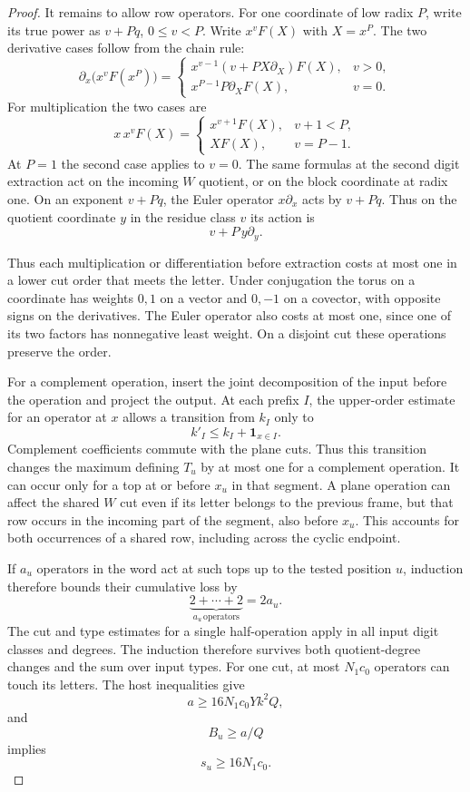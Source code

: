 \begin{proof}
It remains to allow row operators. For one coordinate of low radix
\(P\), write its true power as \(v+Pq\), \(0\le v<P\).
Write \(x^v F(X)\) with \(X=x^P\). The two derivative
cases follow from the chain rule:
\[
 \partial_x\!\bigl(x^vF(x^P)\bigr)=
 \begin{cases}
   x^{v-1}(v+P X\partial_X)F(X),&v>0,\\
   x^{P-1}P\partial_X F(X),&v=0 .
 \end{cases}
\]
For multiplication the two cases are
\[
 x\,x^v F(X)=
 \begin{cases}
 x^{v+1}F(X),&v+1<P,\\
 X F(X),&v=P-1 .
 \end{cases}
\]
At \(P=1\) the second case applies to \(v=0\). The same
formulas at the second digit extraction act on the incoming
\(W\) quotient, or on the block coordinate at radix one. On an exponent \(v+Pq\), the Euler operator \(x\partial_x\) acts by \(v+Pq\). Thus on the quotient coordinate \(y\) in the residue class \(v\) its action is
\[
 v+P\,y\partial_y.
\]

Thus each multiplication or differentiation before extraction costs
at most one in a lower cut order that meets the letter. Under
conjugation the torus on a coordinate has weights \(0,1\) on a
vector and \(0,-1\) on a covector, with opposite signs on the
derivatives. The Euler operator also costs at most one, since one
of its two factors has nonnegative least weight. On a disjoint cut
these operations preserve the order.

For a complement operation, insert the joint decomposition of the
input before the operation and project the output. At each prefix \(I\), the upper-order estimate for an
operator at \(x\) allows a transition from \(k_I\) only to
\[
                          k'_I\le k_I+\mathbf1_{x\in I}.
\]
Complement coefficients commute with the plane cuts. Thus
this transition changes the maximum defining \(T_u\) by
at most one for a complement operation. It can
occur only for a top at or before \(x_u\) in that segment.
A plane operation can affect the shared \(W\) cut even if its
letter belongs to the previous frame, but that row occurs in the
incoming part of the segment, also before \(x_u\).
This accounts for both occurrences of a shared row, including
across the cyclic endpoint.

If \(a_u\) operators in the word act at such tops up to the tested position \(u\), induction therefore bounds their cumulative loss by 
\[
 \underbrace{2+\cdots+2}_{a_u\,\text{operators}}=2a_u.
\]
 The
cut and type estimates for a single half-operation apply in all
input digit classes and degrees. The induction therefore survives
both quotient-degree changes and the sum over input types. For one cut, at most \(N_1c_0\) operators can touch its letters.
The host inequalities give
\[
 a\ge16N_1c_0Yk^2Q,
\]
and
\[
 B_u\ge a/Q
\]
implies
\[
 s_u\ge16N_1c_0.
\]


\end{proof}

